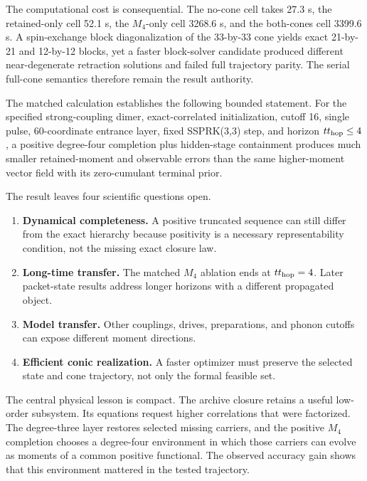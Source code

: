 \documentclass[10pt,letterpaper,twocolumn]{article}
\newcommand{\sectionline}[1]{%
  \Needspace{6\baselineskip}%
  \par\medskip{\color{navy}\large\bfseries #1}\par
  \vspace{-2pt}{\color{navy}\rule{\columnwidth}{0.7pt}}\par\smallskip
}
\begin{document}
The computational cost is consequential.  The no-cone cell takes 27.3 s, the
retained-only cell 52.1 s, the $M_4$-only cell 3268.6 s, and the both-cones cell
3399.6 s.  A spin-exchange block diagonalization of the 33-by-33 cone yields
exact 21-by-21 and 12-by-12 blocks, yet a faster block-solver candidate produced
different near-degenerate retraction solutions and failed full trajectory
parity.  The serial full-cone semantics therefore remain the result authority.

\sectionline{9. What the result establishes}

The matched calculation establishes the following bounded statement.  For the
specified strong-coupling dimer, exact-correlated initialization, cutoff 16,
single pulse, 60-coordinate entrance layer, fixed SSPRK(3,3) step, and horizon
\(t t_{\rm hop}\le4\), a positive degree-four completion plus hidden-stage
containment produces much smaller retained-moment and observable errors than
the same higher-moment vector field with its zero-cumulant terminal prior.

The result leaves four scientific questions open.

\begin{enumerate}
\item \textbf{Dynamical completeness.}  A positive truncated sequence can
still differ from the exact hierarchy because positivity is a necessary
representability condition, not the missing exact closure law.
\item \textbf{Long-time transfer.}  The matched $M_4$ ablation ends at
\(t t_{\rm hop}=4\).  Later packet-state results address longer horizons with
a different propagated object.
\item \textbf{Model transfer.}  Other couplings, drives, preparations, and
phonon cutoffs can expose different moment directions.
\item \textbf{Efficient conic realization.}  A faster optimizer must preserve
the selected state and cone trajectory, not only the formal feasible set.
\end{enumerate}

The central physical lesson is compact.  The archive closure retains a useful
low-order subsystem.  Its equations request higher correlations that were
factorized.  The degree-three layer restores selected missing carriers, and the
positive $M_4$ completion chooses a degree-four environment in which those
carriers can evolve as moments of a common positive functional.  The observed
accuracy gain shows that this environment mattered in the tested trajectory.
\end{document}
